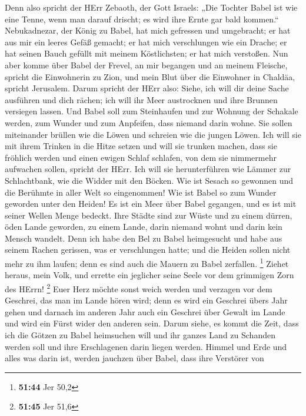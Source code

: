  Denn also spricht der HErr Zebaoth, der Gott Israels: „Die
Tochter Babel ist wie eine Tenne, wenn man darauf drischt; es wird ihre
Ernte gar bald kommen.``  Nebukadnezar, der König zu Babel,
hat mich gefressen und umgebracht; er hat aus mir ein leeres Gefäß
gemacht; er hat mich verschlungen wie ein Drache; er hat seinen Bauch
gefüllt mit meinem Köstlichsten; er hat mich verstoßen. 
Nun aber komme über Babel der Frevel, an mir begangen und an meinem
Fleische, spricht die Einwohnerin zu Zion, und mein Blut über die
Einwohner in Chaldäa, spricht Jerusalem.  Darum spricht der
HErr also: Siehe, ich will dir deine Sache ausführen und dich rächen;
ich will ihr Meer austrocknen und ihre Brunnen versiegen lassen.
 Und Babel soll zum Steinhaufen und zur Wohnung der
Schakale werden, zum Wunder und zum Anpfeifen, dass niemand darin wohne.
 Sie sollen miteinander brüllen wie die Löwen und schreien
wie die jungen Löwen.  Ich will sie mit ihrem Trinken in
die Hitze setzen und will sie trunken machen, dass sie fröhlich werden
und einen ewigen Schlaf schlafen, von dem sie nimmermehr aufwachen
sollen, spricht der HErr.  Ich will sie herunterführen wie
Lämmer zur Schlachtbank, wie die Widder mit den Böcken. 
Wie ist Sesach so gewonnen und die Berühmte in aller Welt so
eingenommen! Wie ist Babel so zum Wunder geworden unter den Heiden!
 Es ist ein Meer über Babel gegangen, und es ist mit seiner
Wellen Menge bedeckt.  Ihre Städte sind zur Wüste und zu
einem dürren, öden Lande geworden, zu einem Lande, darin niemand wohnt
und darin kein Mensch wandelt.  Denn ich habe den Bel zu
Babel heimgesucht und habe aus seinem Rachen gerissen, was er
verschlungen hatte; und die Heiden sollen nicht mehr zu ihm laufen; denn
es sind auch die Mauern zu Babel zerfallen. \footnote{\textbf{51:44} Jer
  50,2}  Ziehet heraus, mein Volk, und errette ein
jeglicher seine Seele vor dem grimmigen Zorn des HErrn! \footnote{\textbf{51:45}
  Jer 51,6}  Euer Herz möchte sonst weich werden und
verzagen vor dem Geschrei, das man im Lande hören wird; denn es wird ein
Geschrei übers Jahr gehen und darnach im anderen Jahr auch ein Geschrei
über Gewalt im Lande und wird ein Fürst wider den anderen sein.
 Darum siehe, es kommt die Zeit, dass ich die Götzen zu
Babel heimsuchen will und ihr ganzes Land zu Schanden werden soll und
ihre Erschlagenen darin liegen werden.  Himmel und Erde und
alles was darin ist, werden jauchzen über Babel, dass ihre Verstörer von
